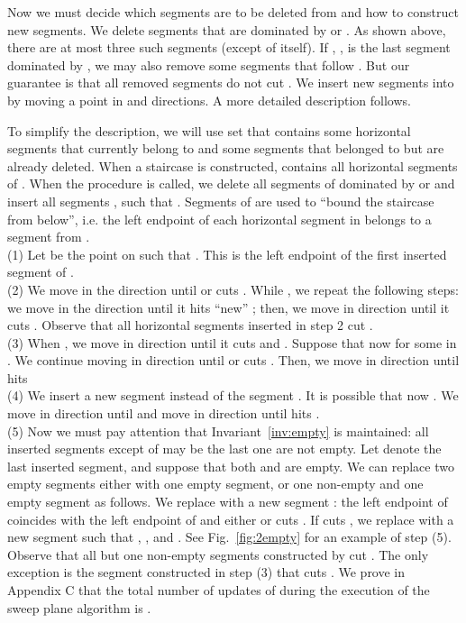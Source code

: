 \documentclass[10pt]{llncs}
\begin{document}
Now we must decide which segments are to be deleted from  and 
how to construct new segments. We delete segments that are dominated 
by  or . As shown above, there are at most three 
such segments (except of  itself). If , , is the last 
segment dominated by , we may also remove some segments that
follow . But our guarantee is that 
all removed segments  do not cut .
We insert new segments into  by moving a point  
in  and  directions.  A more detailed description 
follows.

To simplify the description, we will use  set   
that  contains some horizontal 
segments that currently  belong to   and some segments 
that belonged to  but are already deleted. 
When a staircase  is constructed,  contains all 
horizontal segments of . When the procedure  
is called, we delete all segments of  dominated by  or 
 and insert all segments , such that 
. Segments 
of  are used to  ``bound the staircase  from below'', 
i.e. the left endpoint of each horizontal segment in  belongs 
to a segment from .  \\
(1)  
Let  be the point on  such that . This is the left 
endpoint of the first inserted segment of .\\
(2) We move  in the  direction until  or  
cuts . While  , we repeat the following 
steps: we move  in the  direction until it hits ``new'' 
; then, we move  in  direction until it 
cuts . Observe that all horizontal segments inserted in step 2 
cut .\\
(3) When  , we move  in  direction until 
it cuts  and . 
Suppose 
that now  for some  in . 
We continue 
moving  in  direction until  or  cuts 
. Then, we move  in  direction until  hits 
\\ (4) We insert a new segment  instead of the segment . It is possible 
that now .
We move  in  direction until   and move  in 
 direction until  hits . \\  (5) Now we must pay attention that  Invariant~\ref{inv:empty} is
 maintained: all inserted segments except of may be the last one are not 
empty. 
Let  denote the last inserted segment, and suppose that both  
and  are empty. We can replace two empty segments 
either with one empty segment, or one non-empty and one empty segment
as follows. We replace   with a new segment : 
the left endpoint of  coincides with the left endpoint of  and 
either   or  
 cuts . 
If  cuts , we replace  with a new 
segment  such that , , 
and . See Fig.~\ref{fig:2empty} for an example of
 step (5).\\
Observe that all but one non-empty segments constructed by 
 cut . The only exception is the segment 
constructed in step (3) that cuts . 
We prove in Appendix C 
that the total number of updates of  
during the execution of the sweep plane algorithm is . 
\end{document}
